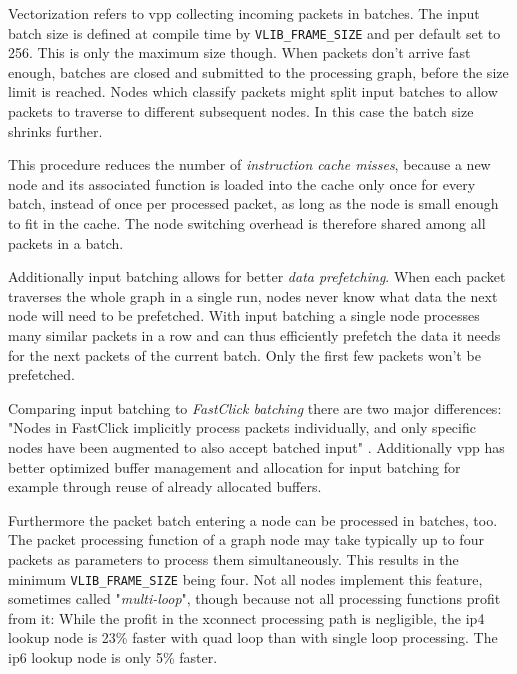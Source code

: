 Vectorization refers to \Ac{vpp} collecting incoming packets in
batches. The input batch size is defined at compile time by
\lstinline|VLIB_FRAME_SIZE| and per default set to 256. This is only
the maximum size though. When packets don't arrive fast enough,
batches are closed and submitted to the processing graph, before the
size limit is reached. Nodes which classify packets might split input
batches  to allow packets to traverse to different subsequent nodes.
In this case the batch size shrinks further.

This procedure reduces the number of \textit{instruction cache misses}, because
a new node and its associated function is loaded into the cache only
once for every batch, instead of once per processed packet, as long as
the node is small enough to fit in the cache. The node switching
overhead is therefore shared among all packets in a batch.

Additionally input batching allows for better \textit{data prefetching}. When
each packet traverses the whole graph in a single run, nodes never
know what data the next node will need to be prefetched. With input
batching a single node processes many similar packets in a row and can
thus efficiently prefetch the data it needs for the next packets of
the current batch. Only the first few packets won't be prefetched.

Comparing input batching to \textit{FastClick batching} there are two major
differences: "Nodes in FastClick implicitly process packets
individually, and only specific nodes have been augmented to also
accept batched input" \cite{linguaglossa2017high}. Additionally
\Ac{vpp} has better optimized buffer management and allocation for
input batching for example through reuse of already allocated buffers.
\cite{linguaglossa2017high}

Furthermore the packet batch entering a node can be processed in
batches, too. The packet processing function of a graph node may take
typically up to four packets as parameters to process them
simultaneously. This results in the minimum
\lstinline|VLIB_FRAME_SIZE| being four. Not all nodes implement this
feature, sometimes called "\textit{multi-loop}", though because not
all processing functions profit from it: While the profit in the
xconnect processing path is negligible, the \Ac{ip4} lookup node is
23\% faster with quad loop than with single loop processing. The
\Ac{ip6} lookup node is only 5\% faster. \cite{linguaglossa2017high}



